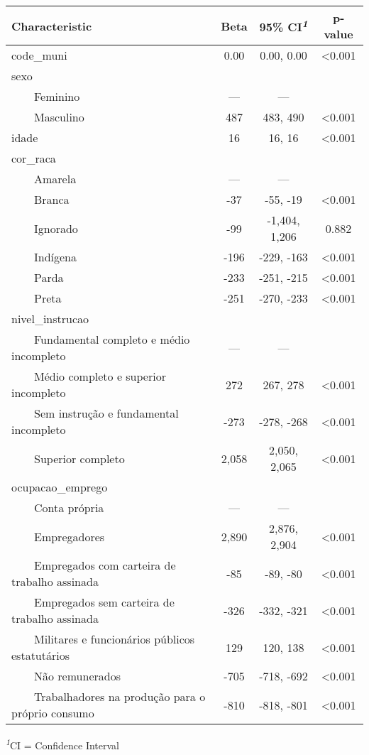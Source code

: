\begingroup
\fontsize{12.0pt}{14.4pt}\selectfont
\setlength{\LTpost}{0mm}
\begin{longtable}{lccc}
\toprule
\textbf{Characteristic} & \textbf{Beta} & \textbf{95\% CI}\textsuperscript{\textit{1}} & \textbf{p-value} \\ 
\midrule\addlinespace[2.5pt]
code\_muni & 0.00 & 0.00, 0.00 & <0.001 \\ 
sexo &  &  &  \\ 
    Feminino & — & — &  \\ 
    Masculino & 487 & 483, 490 & <0.001 \\ 
idade & 16 & 16, 16 & <0.001 \\ 
cor\_raca &  &  &  \\ 
    Amarela & — & — &  \\ 
    Branca & -37 & -55, -19 & <0.001 \\ 
    Ignorado & -99 & -1,404, 1,206 & 0.882 \\ 
    Indígena & -196 & -229, -163 & <0.001 \\ 
    Parda & -233 & -251, -215 & <0.001 \\ 
    Preta & -251 & -270, -233 & <0.001 \\ 
nivel\_instrucao &  &  &  \\ 
    Fundamental completo e médio incompleto & — & — &  \\ 
    Médio completo e superior incompleto & 272 & 267, 278 & <0.001 \\ 
    Sem instrução e fundamental incompleto & -273 & -278, -268 & <0.001 \\ 
    Superior completo & 2,058 & 2,050, 2,065 & <0.001 \\ 
ocupacao\_emprego &  &  &  \\ 
    Conta própria & — & — &  \\ 
    Empregadores & 2,890 & 2,876, 2,904 & <0.001 \\ 
    Empregados com carteira de trabalho assinada & -85 & -89, -80 & <0.001 \\ 
    Empregados sem carteira de trabalho assinada & -326 & -332, -321 & <0.001 \\ 
    Militares e funcionários públicos estatutários & 129 & 120, 138 & <0.001 \\ 
    Não remunerados & -705 & -718, -692 & <0.001 \\ 
    Trabalhadores na produção para o próprio consumo & -810 & -818, -801 & <0.001 \\ 
\bottomrule
\end{longtable}
\begin{minipage}{\linewidth}
\textsuperscript{\textit{1}}CI = Confidence Interval\\
\end{minipage}
\endgroup

